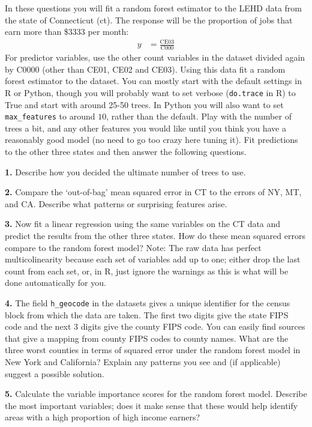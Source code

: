 \documentclass[12pt]{article}
\begin{document}
In these questions you will fit a random forest estimator to the LEHD data from
the state of Connecticut (ct). The response will be the proportion of jobs that
earn more than \$3333 per month:
\begin{align*}
y &= \frac{\text{CE03}}{\text{C000}}
\end{align*}
For predictor variables, use the other count variables in the dataset divided
again by C0000 (other than CE01, CE02 and CE03). Using this data fit a random
forest estimator to the dataset. You can mostly start with the default settings
in R or Python, though you will probably want to set verbose (\texttt{do.trace} in R)
to True and start with around 25-50 trees. In Python you will also want to
set \texttt{max\_features} to around $10$, rather than the default. Play with the number
of trees a bit, and any other features you would like until you think you have a
reasonably good model (no need to go too crazy here tuning it). Fit predictions
to the other three states and then answer the following questions.

\textbf{1.} Describe how you decided the ultimate number of trees to use.

\textbf{2.} Compare the `out-of-bag' mean squared error in CT to the errors of NY,
MT, and CA. Describe what patterns or surprising features arise.

\textbf{3.} Now fit a linear regression using the same variables on the CT data
and predict the results from the other three states. How do these mean squared
errors compare to the random forest model? Note: The raw data has perfect
multicolinearity because each set of variables add up to one; either drop
the last count from each set, or, in R, just ignore the warnings as this is
what will be done automatically for you.

\textbf{4.} The field \texttt{h\_geocode} in the datasets gives a unique identifier
for the census block from which the data are taken. The first two digits give the
state FIPS code and the next 3 digits give the county FIPS code. You can easily find
sources that give a mapping from county FIPS codes to county names. What are the
three worst counties in terms of squared error under the random forest model
in New York and California? Explain any patterns you see and (if applicable)
suggest a possible solution.

\textbf{5.} Calculate the variable importance scores for the random forest model.
Describe the most important variables; does it make sense that these would help
identify areas with a high proportion of high income earners?
\end{document}
